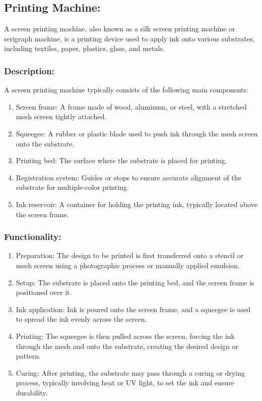 \subsection{Printing Machine:} A screen printing machine, also known
as a silk screen printing machine or serigraph machine, is a printing
device used to apply ink onto various substrates, including textiles,
paper, plastics, glass, and metals.

\subsubsection{Description:}


A screen printing machine typically consists of the following main
components:


\begin{enumerate}
\item
  Screen frame: A frame made of wood, aluminum, or steel, with a
  stretched mesh screen tightly attached.
\item
  Squeegee: A rubber or plastic blade used to push ink through the mesh
  screen onto the substrate.
\item
  Printing bed: The surface where the substrate is placed for printing.
\item
  Registration system: Guides or stops to ensure accurate alignment of
  the substrate for multiple-color printing.
\item
  Ink reservoir: A container for holding the printing ink, typically
  located above the screen frame.
\end{enumerate}

\subsubsection{Functionality:}

\begin{enumerate}
\item
  Preparation: The design to be printed is first transferred onto a
  stencil or mesh screen using a photographic process or manually
  applied emulsion.
\item
  Setup: The substrate is placed onto the printing bed, and the screen
  frame is positioned over it.
\item
  Ink application: Ink is poured onto the screen frame, and a squeegee
  is used to spread the ink evenly across the screen.
\item
  Printing: The squeegee is then pulled across the screen, forcing the
  ink through the mesh and onto the substrate, creating the desired
  design or pattern.
\item
  Curing: After printing, the substrate may pass through a curing or
  drying process, typically involving heat or UV light, to set the ink
  and ensure durability.
\end{enumerate}

